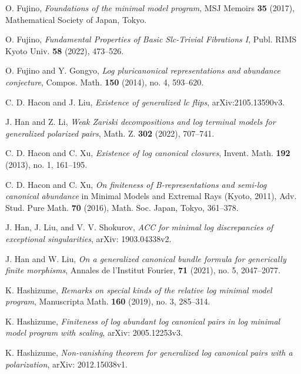 \documentclass[11pt]{amsart}
\numberwithin{equation}{section}
\theoremstyle{definition}
\theoremstyle{definition}
\theoremstyle{definition}
\begin{document}
\begin{thebibliography}{ABCDE}

 O. Fujino, \textit{Foundations of the minimal model program}, MSJ Memoirs \textbf{35} (2017), Mathematical Society of Japan, Tokyo.

 O. Fujino, \textit{Fundamental Properties of Basic Slc-Trivial Fibrations I}, Publ. RIMS Kyoto Univ. \textbf{58} (2022), 473--526.

 O. Fujino and Y. Gongyo, \textit{Log pluricanonical representations and abundance conjecture}, Compos. Math. \textbf{150} (2014), no. 4, 593--620.

 C. D. Hacon and J. Liu, \textit{Existence of generalized lc flips}, arXiv:2105.13590v3.

 J. Han and Z. Li, \textit{Weak Zariski decompositions and log terminal models for generalized polarized pairs}, Math. Z. \textbf{302} (2022), 707--741.

 C. D. Hacon and C. Xu, \textit{Existence of log canonical closures}, Invent. Math. \textbf{192} (2013), no. 1, 161--195.

 C. D. Hacon and C. Xu, \textit{On finiteness of B-representations and semi-log canonical abundance} in Minimal Models and Extremal Rays (Kyoto, 2011), Adv. Stud. Pure Math. \textbf{70} (2016), Math. Soc. Japan, Tokyo, 361--378. 


 J. Han, J. Liu, and V. V. Shokurov, \textit{ACC for minimal log discrepancies of exceptional singularities}, arXiv: 1903.04338v2.

 J. Han and W. Liu, \textit{On a generalized canonical bundle formula for generically finite morphisms}, Annales de l'Institut Fourier, \textbf{71} (2021), no. 5, 2047--2077.


 K. Hashizume, \textit{Remarks on special kinds of the relative log minimal model program}, Manuscripta Math. \textbf{160} (2019), no. 3, 285--314.

 K. Hashizume, \textit{Finiteness of log abundant log canonical pairs in log minimal model program with scaling}, arXiv: 2005.12253v3.

 K. Hashizume, \textit{Non-vanishing theorem for generalized log canonical pairs with a polarization}, arXiv: 2012.15038v1.


\end{thebibliography}
\end{document}

